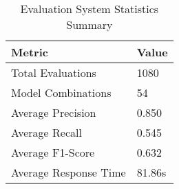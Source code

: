 \begin{table}
\caption{Evaluation System Statistics Summary}
\label{tab:system_stats}
\begin{tabular}{ll}
\toprule
Metric & Value \\
\midrule
Total Evaluations & 1080 \\
Model Combinations & 54 \\
Average Precision & 0.850 \\
Average Recall & 0.545 \\
Average F1-Score & 0.632 \\
Average Response Time & 81.86s \\
\bottomrule
\end{tabular}
\end{table}
